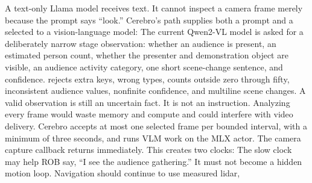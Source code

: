 {}A text-only Llama model receives text. It cannot inspect a camera frame merely\markdownRendererSoftLineBreak
{}because the prompt says “look.” Cerebro's  path supplies both a prompt\markdownRendererSoftLineBreak
{}and a selected  to a vision-language model:\markdownRendererInterblockSeparator
{}\markdownRendererInterblockSeparator
{}The current Qwen2-VL model is asked for a deliberately narrow stage\markdownRendererSoftLineBreak
{}observation: whether an audience is present, an estimated person count,\markdownRendererSoftLineBreak
{}whether the presenter and demonstration object are visible, an audience\markdownRendererSoftLineBreak
{}activity category, one short scene-change sentence, and confidence.\markdownRendererInterblockSeparator
{}\markdownRendererInterblockSeparator
{} rejects extra keys, wrong types, counts outside\markdownRendererSoftLineBreak
{}zero through fifty, inconsistent audience values, nonfinite confidence, and\markdownRendererSoftLineBreak
{}multiline scene changes. A valid observation is still an uncertain fact. It is\markdownRendererSoftLineBreak
{}not an instruction.\markdownRendererInterblockSeparator
{}\markdownRendererSectionBegin
{}\markdownRendererInterblockSeparator
{}Analyzing every frame would waste memory and compute and could interfere with\markdownRendererSoftLineBreak
{}video delivery. Cerebro accepts at most one selected frame per bounded interval,\markdownRendererSoftLineBreak
{}with a minimum of three seconds, and runs VLM work on the MLX actor. The camera\markdownRendererSoftLineBreak
{}capture callback returns immediately. This creates two clocks:\markdownRendererInterblockSeparator
{}\markdownRendererInterblockSeparator
{}The slow clock may help ROB say, “I see the audience gathering.” It must not\markdownRendererSoftLineBreak
{}become a hidden motion loop. Navigation should continue to use measured lidar,\markdownRendererSoftLineBreak
